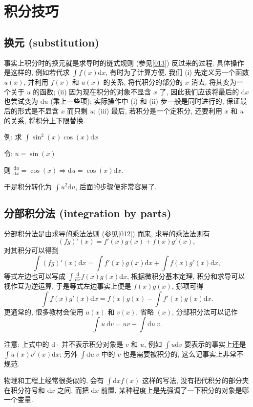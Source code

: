 \section{积分技巧}\label{020}

\subsection{换元 (substitution)}

事实上积分时的换元就是求导时的链式规则 (参见\ref{013}) 反过来的过程.
具体操作是这样的, 例如若代求 \(\int f(x)\mathrm{d}x\), 有时为了计算方便,
我们 (i) 先定义另一个函数 \(u(x)\), 并利用 \(f(x)\) 和 \(u(x)\) 的关系,
将代积分的部分的 \(x\) 消去, 将其变为一个关于 \(u\) 的函数; (ii)
因为现在积分的对象不显含 \(x\) 了, 因此我们应该将最后的 \(\mathrm{d}x\)
也尝试变为 \(\mathrm{d}u\) (乘上一些项); 实际操作中 (i) 和 (ii)
步一般是同时进行的, 保证最后的形式是不显含 \(x\) 而只剩 \(u\); (iii)
最后, 若积分是一个定积分, 还要利用 \(x\) 和 \(u\) 的关系,
将积分上下限替换.

\begin{newquote}
例: 求 \(\int\sin^2(x)\cos(x)\mathrm{d}x\)

令: \(u=\sin(x)\)

则
\(\frac{\mathrm{d}u}{\mathrm{d}x}=\cos(x)\Rightarrow\mathrm{d}u=\cos(x)\mathrm{d}x\).

于是积分转化为 \(\int u^2\mathrm{d}u\), 后面的步骤便非常容易了.
\end{newquote}

\subsection{分部积分法 (integration by parts)}

分部积分法是由求导的乘法法则 (参见\ref{012}) 而来, 求导的乘法法则有 \[
(fg)'(x)=f'(x)g(x)+f(x)g'(x),
\] 对其积分可以得到 \[
\int(fg)'(x)\mathrm{d}x=\int f'(x)g(x)\mathrm{d}x+\int f(x)g'(x)\mathrm{d}x,
\] 等式左边也可以写成
\(\int\frac{\mathrm{d}}{\mathrm{d}x}f(x)g(x)\mathrm{d}x\),
根据微积分基本定理, 积分和求导可以视作互为逆运算, 于是等式左边事实上便是
\(f(x)g(x)\), 挪项可得 \[
\int f(x)g'(x)\mathrm{d}x=f(x)g(x)-\int f'(x)g(x)\mathrm{d}x.
\] 更通常的, 很多教材会使用 \(u(x)\) 和 \(v(x)\), 省略 \((x)\),
分部积分法可以记作 \[
\boxed{\int u\ \mathrm{d}v=uv-\int \mathrm{d}u\ v}.
\]

\begin{newquote}
注意: 上式中的 \(\mathrm{d}\cdot\) 并不表示积分对象是 \(v\) 和 \(u\),
例如 \(\int u\mathrm{d}v\) 要表示的事实上还是
\(\int u(x)v'(x)\mathrm{d}x\); 另外 \(\int \mathrm{d}u\ v\) 中的 \(v\)
也是需要被积分的, 这么记事实上非常不规范.

物理和工程上经常很类似的, 会有 \(\int\mathrm{d}x f(x)\) 这样的写法,
没有把代积分的部分夹在积分符号和 \(\mathrm{d}x\) 之间, 而把
\(\mathrm{d}x\) 前置, 某种程度上是先强调了一下积分的对象是哪一个变量.
\end{newquote}

